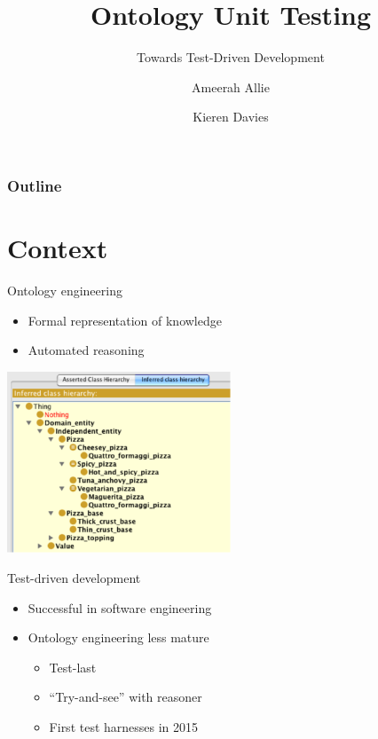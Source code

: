 \documentclass[17pt,mathserif]{beamer}
\begin{document}
\title{Ontology Unit Testing}
\subtitle{Towards Test-Driven Development}
\author{Ameerah Allie \and Kieren Davies}
\date{}
\titlepage

\begin{frame}
  \frametitle{Outline}
  \tableofcontents
\end{frame}

\section{Context}

\begin{frame}{Ontology engineering}
  \begin{itemize}
    \item Formal representation of knowledge
    \item Automated reasoning
  \end{itemize}
  \centering
  \includegraphics[width=0.5\textwidth]{pizza}
\end{frame}

\begin{frame}{Test-driven development}
  \begin{itemize}
    \item Successful in software engineering
    \item Ontology engineering less mature
    \begin{itemize}
      \item Test-last
      \item ``Try-and-see'' with reasoner
      \item First test harnesses in 2015
    \end{itemize}
  \end{itemize}
\end{frame}
\end{document}
